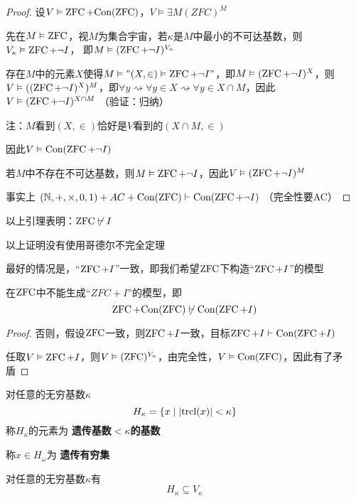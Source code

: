 \documentclass[11pt]{article}
\begin{document}
\begin{proof}
设\(V\vDash\operatorname{ZFC}+\text{Con}(\operatorname{ZFC})\)，\(V\vDash\exists M(ZFC)^M\)

先在\(M\vDash\operatorname{ZFC}\)，视\(M\)为集合宇宙，若\(\kappa\)是\(M\)中最小的不可达基数，则\(V_\kappa\vDash\operatorname{ZFC}+\neg I\)，
即\(M\vDash(\operatorname{ZFC}+\neg I)^{V_\kappa}\)

存在\(M\)中的元素\(X\)使得\(M\vDash"(X,\in)\vDash\operatorname{ZFC}+\neg I"\)，即\(M\vDash(\operatorname{ZFC}+\neg I)^X\)，则
\(V\vDash((\operatorname{ZFC}+\neg I)^X)^M\)，即\(\forall y\rightsquigarrow\forall y\in X\rightsquigarrow\forall y\in X\cap M\)，因此
\(V\vDash(\operatorname{ZFC}+\neg I)^{X\cap M}\) （验证：归纳）

注：\(M\)看到\((X,\in)\)恰好是\(V\)看到的\((X\cap M,\in)\)

因此\(V\vDash\text{Con}(\operatorname{ZFC}+\neg I)\)

若\(M\)中不存在不可达基数，则\(M\vDash\operatorname{ZFC}+\neg I\)，因此\(V\vDash(\operatorname{ZFC}+\neg I)^M\)

事实上
\((\mathbb{N},+,\times,0,1)+AC+\text{Con}(\operatorname{ZFC})\vdash\text{Con}(\operatorname{ZFC}+\neg I)\)
（完全性要AC）
\end{proof}

以上引理表明：\(\operatorname{ZFC}\not\vdash I\)

以上证明没有使用哥德尔不完全定理

最好的情况是，“\(\operatorname{ZFC}+I\)”一致，即我们希望\(\operatorname{ZFC}\)下构造“\(\operatorname{ZFC}+I\)”的模型

\begin{corollary}[]
在\(\operatorname{ZFC}\)中不能生成“\(ZFC+I\)”的模型，即
\begin{equation*}
\operatorname{ZFC}+\text{Con}(\operatorname{ZFC})\not\vdash\text{Con}(\operatorname{ZFC}+I)
\end{equation*}
\end{corollary}

\begin{proof}
否则，假设\(\operatorname{ZFC}\)一致，则\(\operatorname{ZFC}+I\)一致，目标\(\operatorname{ZFC}+I\vdash\text{Con}(\operatorname{ZFC}+I)\)

任取\(V\vDash\operatorname{ZFC}+I\)，则\(V\vDash(\operatorname{ZFC})^{V_\kappa}\)，由完全性，\(V\vDash\text{Con}(\operatorname{ZFC})\)，因此有了矛盾
\end{proof}

\begin{definition}[]
对任意的无穷基数\(\kappa\)
\begin{equation*}
H_\kappa=\{x\mid\abs{\trcl(x)}<\kappa\}
\end{equation*}
称\(H_\kappa\)的元素为 \textbf{遗传基数\(<\kappa\)的基数}

称\(x\in H_\omega\)为 \textbf{遗传有穷集}
\end{definition}

\begin{lemma}
对任意的无穷基数\(\kappa\)有
\begin{equation*}
H_\kappa\subseteq V_\kappa
\end{equation*}
\end{lemma}
\end{document}
